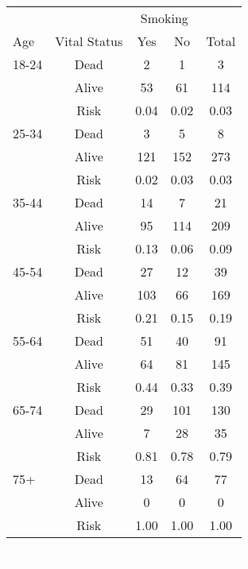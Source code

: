 \documentclass[landscape,twocolumn,letterpaper,9pt,reqno]{article}\usepackage[]{graphicx}\usepackage[]{color}
\begin{document}
\begin{table}[h]
	\centering
	\begin{tabular}{lcccc}
		 &  &   \multicolumn{2}{c}{Smoking} &  \\		
		Age & Vital Status &  Yes & No & Total \\
		18-24 	& Dead 	& 2  	& 1 	& 3 	\\	
		 		& Alive & 53  	& 61 	& 114 	\\
		 		& Risk & 0.04  	& 0.02 	& 0.03 	\\
		 		\hline
		25-34 	& Dead 	& 3  	& 5 	& 8 	\\	
& Alive & 121  	& 152 	& 273 	\\
& Risk & 0.02  	& 0.03 	& 0.03 \\
\hline 			
35-44 	& Dead 	& 14  	& 7 	& 21 	\\	
& Alive & 95  	& 114 	& 209 	\\
& Risk & 0.13  	& 0.06 	& 0.09 \\
\hline
45-54 	& Dead 	& 27  	& 12 	& 39 	\\	
& Alive & 103  	& 66 	& 169 	\\
& Risk & 0.21  	& 0.15 	& 0.19 \\
		 		\hline
55-64 	& Dead 	& 51  	& 40 	& 91 	\\	
& Alive & 64  	& 81 	& 145 	\\
& Risk & 0.44  	& 0.33 	& 0.39 \\
		 		\hline
65-74 	& Dead 	& 29  	& 101 	& 130 	\\	
& Alive & 7  	& 28 	& 35 	\\
& Risk & 0.81  	& 0.78 	& 0.79 \\
		 		\hline
75+ 	& Dead 	& 13  	& 64 	& 77 	\\	
& Alive & 0  	& 0 	& 0 	\\
& Risk & 1.00  	& 1.00 	& 1.00 \\
\hline
	\end{tabular}
\end{table}

\clearpage

\textcolor{white}{text}
\end{document}
